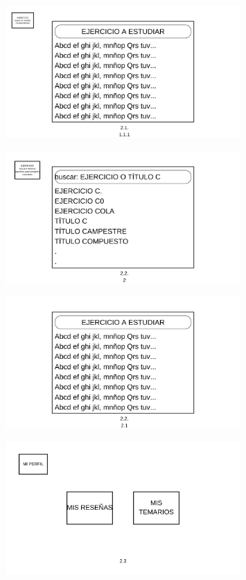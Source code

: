 \documentclass{report}
\begin{document}
\begin{figure}[H]
    \centering
    \includegraphics[width=0.8\textwidth]{./Diagramas/18.png}
\end{figure}

\begin{figure}[H]
    \centering
    \includegraphics[width=0.8\textwidth]{./Diagramas/19.png}
\end{figure}

\begin{figure}[H]
    \centering
    \includegraphics[width=0.8\textwidth]{./Diagramas/20.png}
\end{figure}

\begin{figure}[H]
    \centering
    \includegraphics[width=0.8\textwidth]{./Diagramas/21.png}
\end{figure}
\end{document}
